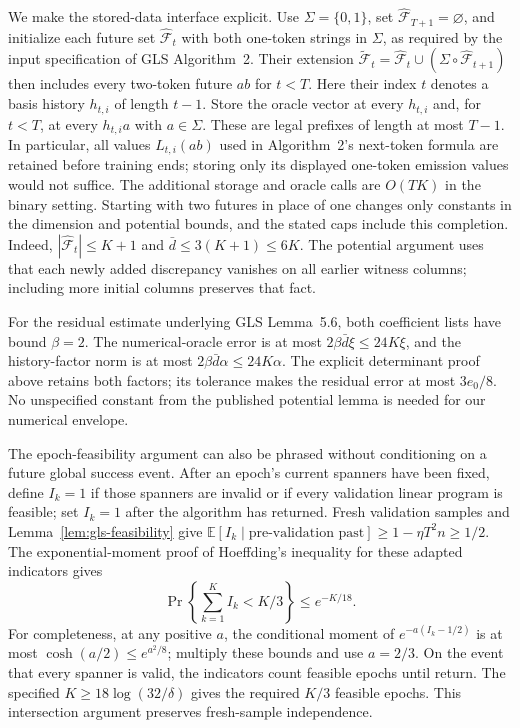 \documentclass[11pt]{article}
\theoremstyle{definition}
\theoremstyle{remark}
\begin{document}
We make the stored-data interface explicit. Use $\Sigma=\{0,1\}$, set $\hat{\mathcal F}_{T+1}=\varnothing$, and initialize each future set $\hat{\mathcal F}_t$ with both one-token strings in $\Sigma$, as required by the input specification of GLS Algorithm~2. Their extension
$\tilde{\mathcal F}_t=\hat{\mathcal F}_t\cup(\Sigma\circ\hat{\mathcal F}_{t+1})$
then includes every two-token future $ab$ for $t<T$. Here their index $t$ denotes a basis history $h_{t,i}$ of length $t-1$. Store the oracle vector at every $h_{t,i}$ and, for $t<T$, at every $h_{t,i}a$ with $a\in\Sigma$. These are legal prefixes of length at most $T-1$. In particular, all values $L_{t,i}(ab)$ used in Algorithm~2's next-token formula are retained before training ends; storing only its displayed one-token emission values would not suffice. The additional storage and oracle calls are $O(TK)$ in the binary setting. Starting with two futures in place of one changes only constants in the dimension and potential bounds, and the stated caps include this completion. Indeed, $|\hat{\mathcal F}_t|\le K+1$ and $\bar d\le3(K+1)\le6K$. The potential argument uses that each newly added discrepancy vanishes on all earlier witness columns; including more initial columns preserves that fact.

For the residual estimate underlying GLS Lemma~5.6, both coefficient lists have bound $\beta=2$. The numerical-oracle error is at most $2\beta\bar d\xi\le24K\xi$, and the history-factor norm is at most $2\beta\bar d\alpha\le24K\alpha$. The explicit determinant proof above retains both factors; its tolerance makes the residual error at most $3e_0/8$. No unspecified constant from the published potential lemma is needed for our numerical envelope.

The epoch-feasibility argument can also be phrased without conditioning on a future global success event. After an epoch's current spanners have been fixed, define $I_k=1$ if those spanners are invalid or if every validation linear program is feasible; set $I_k=1$ after the algorithm has returned. Fresh validation samples and Lemma~\ref{lem:gls-feasibility} give $\mathbb E[I_k\mid\text{pre-validation past}]\ge1-\eta T^2n\ge1/2$. The exponential-moment proof of Hoeffding's inequality for these adapted indicators gives
\[
\Pr\left\{\sum_{k=1}^KI_k<K/3\right\}\le e^{-K/18}.
\]
For completeness, at any positive $a$, the conditional moment of $e^{-a(I_k-1/2)}$ is at most $\cosh(a/2)\le e^{a^2/8}$; multiply these bounds and use $a=2/3$. On the event that every spanner is valid, the indicators count feasible epochs until return. The specified $K\ge18\log(32/\delta)$ gives the required $K/3$ feasible epochs. This intersection argument preserves fresh-sample independence.
\end{document}
